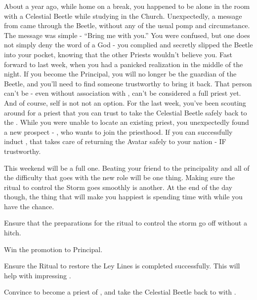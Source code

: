 \documentclass[char]{GL2020}
\begin{document}
About a year ago, while home on a break, you happened to be alone in the room with a Celestial Beetle while studying in the Church. Unexpectedly, a message from \cTechGod{} came through the Beetle, without any of the usual pomp and circumstance. The message was simple - “Bring me with you.” You were confused, but one does not simply deny the word of a God - you complied and secretly slipped the Beetle into your pocket, knowing that the other Priests wouldn’t believe you. Fast forward to last week, when you had a panicked realization in the middle of the night. If you become the Principal, you will no longer be the guardian of the Beetle, and you’ll need to find someone trustworthy to bring it back. That person can’t be \cScholarship{} - even without \cScholarship{\their} association with \cAntiChup{}, \cScholarship{\they} can’t be considered a full priest yet. And of course, \cAntiChup{} \cAntiChup{\them}self is not not an option. For the last week, you’ve been scouting around for a priest that you can trust to take the Celestial Beetle safely back to the \pTech{}. While you were unable to locate an existing priest, you unexpectedly found a new prospect - \cHeadScientist{}, who wants to join the priesthood. If you can successfully induct \cHeadScientist{}, that takes care of returning the Avatar safely to your nation - IF \cHeadScientist{\theyare} trustworthy.

This weekend will be a full one. Beating your friend \cMusic{} to the principality and all of the difficulty that goes with the new role will be one thing. Making sure the ritual to control the Storm goes smoothly is another.  At the end of the day though, the thing that will make you happiest is spending time with \cJuniorStatesman{} while you have the chance. 




\begin{itemz}[Goals]
	\item Ensure that the preparations for the ritual to control the storm go off without a hitch.
	\item Win the promotion to Principal.
\item Ensure the Ritual to restore the Ley Lines is completed successfully. This will help with impressing \cPrincipal{}.
\item Convince \cHeadScientist{} to become a priest of \cTechGod{}, and take the Celestial Beetle back to \pTech{} with \cHeadScientist{\them}.
\end{itemz}
\end{document}
